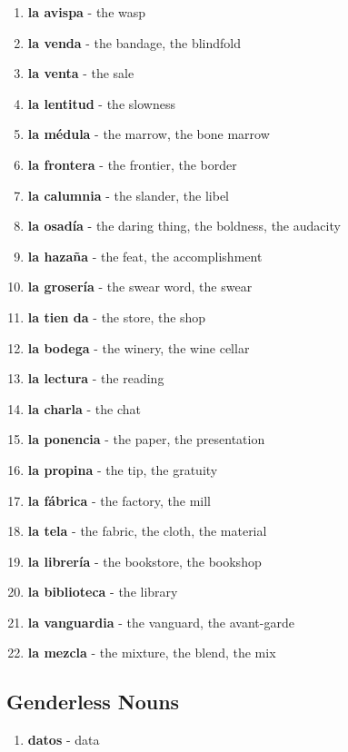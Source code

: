 \documentclass[12pt]{article}
\begin{document}
\begin{enumerate}
                \item \textbf{la avispa} - the wasp
                \item \textbf{la venda} - the bandage, the blindfold
                \item \textbf{la venta} - the sale
                \item \textbf{la lentitud} - the slowness
                \item \textbf{la médula} - the marrow, the bone marrow
                \item \textbf{la frontera} - the frontier, the border
                \item \textbf{la calumnia} - the slander, the libel
                \item \textbf{la osadía} - the daring thing, the boldness, the audacity
                \item \textbf{la hazaña} - the feat, the accomplishment
                \item \textbf{la grosería} - the swear word, the swear
                \item \textbf{la tien   da} - the store, the shop
                \item \textbf{la bodega} - the winery, the wine cellar
                \item \textbf{la lectura} - the reading
                \item \textbf{la charla} - the chat
                \item \textbf{la ponencia} - the paper, the presentation
                \item \textbf{la propina} - the tip, the gratuity
                \item \textbf{la fábrica} - the factory, the mill
                \item \textbf{la tela} - the fabric, the cloth, the material
                \item \textbf{la librería} - the bookstore, the bookshop
                \item \textbf{la biblioteca} - the library
                \item \textbf{la vanguardia} - the vanguard, the avant-garde
                \item \textbf{la mezcla} - the mixture, the blend, the mix
            \end{enumerate}
        \subsection {Genderless Nouns}
            \begin{enumerate}
                \item \textbf{datos} - data
            \end{enumerate}
\end{document}
